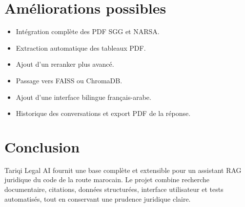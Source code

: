 \documentclass[12pt,a4paper]{article}
\begin{document}
\section{Améliorations possibles}

\begin{itemize}[leftmargin=1.2cm]
    \item Intégration complète des PDF SGG et NARSA.
    \item Extraction automatique des tableaux PDF.
    \item Ajout d'un reranker plus avancé.
    \item Passage vers FAISS ou ChromaDB.
    \item Ajout d'une interface bilingue français-arabe.
    \item Historique des conversations et export PDF de la réponse.
\end{itemize}

\section{Conclusion}

Tariqi Legal AI fournit une base complète et extensible pour un assistant RAG juridique
du code de la route marocain. Le projet combine recherche documentaire, citations,
données structurées, interface utilisateur et tests automatisés, tout en conservant une
prudence juridique claire.
\end{document}

